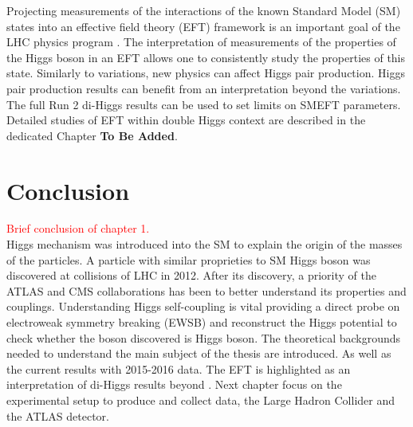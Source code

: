 Projecting measurements of the interactions of the known Standard Model (SM) states into an effective field theory (EFT) framework is an important goal of the LHC physics program \cite{LHC_EFT}. The interpretation of measurements of the properties of the Higgs boson in an
EFT allows one to consistently study the properties of this state. Similarly to \kl variations, new physics can affect Higgs pair production. Higgs pair production results can benefit from an interpretation beyond the \kl variations. The full Run 2 di-Higgs results can be used to set limits on SMEFT parameters. Detailed studies of EFT within double Higgs context are described in the dedicated Chapter \textbf{To Be Added}.
\section{Conclusion}
\label{chap1:Conc}

\textcolor{red}{Brief conclusion of chapter 1.\\}
Higgs mechanism was introduced into the SM to explain the origin of the masses of the particles. A particle with similar proprieties to SM Higgs boson was discovered at collisions of LHC in 2012. After its discovery, a priority of the ATLAS and CMS collaborations has been to better understand its properties and couplings. Understanding Higgs self-coupling is vital providing a direct probe on electroweak symmetry breaking (EWSB) and reconstruct the Higgs potential to check whether the boson discovered is Higgs boson. The theoretical backgrounds needed to understand the main subject of the thesis are introduced. As well as the current results with 2015-2016 data. The EFT is highlighted as an interpretation of di-Higgs results beyond \kl. Next chapter focus on the experimental setup to produce and collect data, the Large Hadron Collider and the ATLAS detector. 

